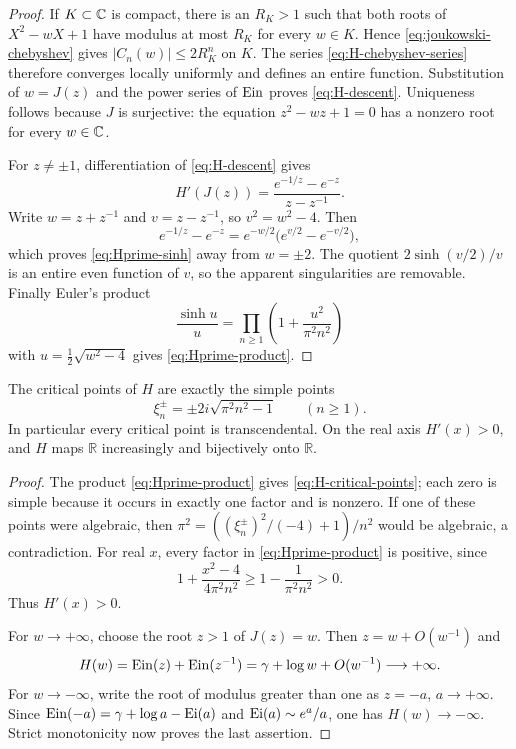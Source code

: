 \begin{proof}
If $K\subset\mathbb C$ is compact, there is an $R_K>1$ such that both roots of
$X^2-wX+1$ have modulus at most $R_K$ for every $w\in K$.  Hence
\eqref{eq:joukowski-chebyshev} gives
$|C_n(w)|\leq2R_K^n$ on $K$.  The series
\eqref{eq:H-chebyshev-series} therefore converges locally uniformly and
defines an entire function.  Substitution of $w=J(z)$ and the power series
of $\operatorname{Ein}$ proves \eqref{eq:H-descent}.  Uniqueness follows because $J$ is
surjective: the equation $z^2-wz+1=0$ has a nonzero root for every
$w\in\mathbb C$.

For $z\ne\pm1$, differentiation of \eqref{eq:H-descent} gives
\[
 H'(J(z))
 =\frac{e^{-1/z}-e^{-z}}{z-z^{-1}}.
\]
Write $w=z+z^{-1}$ and $v=z-z^{-1}$, so $v^2=w^2-4$.  Then
\[
 e^{-1/z}-e^{-z}
 =e^{-w/2}\bigl(e^{v/2}-e^{-v/2}\bigr),
\]
which proves \eqref{eq:Hprime-sinh} away from $w=\pm2$.  The quotient
$2\sinh(v/2)/v$ is an entire even function of $v$, so the apparent
singularities are removable.  Finally Euler's product
\[
 \frac{\sinh u}{u}=\prod_{n\geq1}
   \left(1+\frac{u^2}{\pi^2n^2}\right)
\]
with $u=\frac12\sqrt{w^2-4}$ gives
\eqref{eq:Hprime-product}.
\end{proof}

\begin{corollary}
\label{cor:H-critical-lattice}
The critical points of $H$ are exactly the simple points
\begin{equation}\label{eq:H-critical-points}
 \xi_n^\pm=\pm2i\sqrt{\pi^2n^2-1}\qquad(n\geq1).
\end{equation}
In particular every critical point is transcendental.  On the real axis
$H'(x)>0$, and $H$ maps $\mathbb R$ increasingly and bijectively onto
$\mathbb R$.
\end{corollary}

\begin{proof}
The product \eqref{eq:Hprime-product} gives
\eqref{eq:H-critical-points}; each zero is simple because it occurs in
exactly one factor and is nonzero.  If one of these points were algebraic,
then $\pi^2=((\xi_n^\pm)^2/(-4)+1)/n^2$ would be algebraic, a contradiction.
For real $x$, every factor in \eqref{eq:Hprime-product} is positive, since
\[
 1+\frac{x^2-4}{4\pi^2n^2}
 \geq1-\frac1{\pi^2n^2}>0.
\]
Thus $H'(x)>0$.

For $w\to+\infty$, choose the root $z>1$ of $J(z)=w$.  Then
$z=w+O(w^{-1})$ and
\[
 H(w)=\operatorname{Ein}(z)+\operatorname{Ein}(z^{-1})
     =\gamma+\log w+O(w^{-1})\longrightarrow+\infty.
\]
For $w\to-\infty$, write the root of modulus greater than one as $z=-a$,
$a\to+\infty$.  Since
$\operatorname{Ein}(-a)=\gamma+\log a-\operatorname{Ei}(a)$ and
$\operatorname{Ei}(a)\sim e^a/a$, one has $H(w)\to-\infty$.  Strict monotonicity now
proves the last assertion.
\end{proof}

